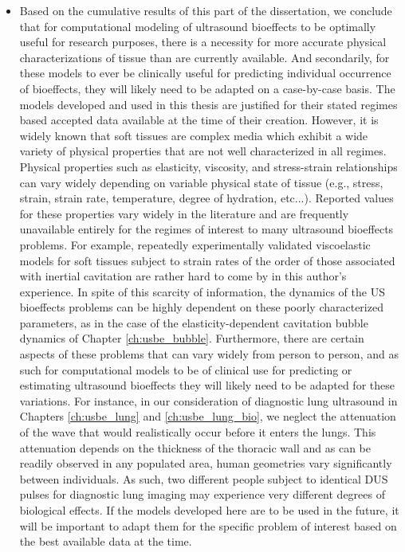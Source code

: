 \begin{itemize}
\item Based on the cumulative results of this part of the
  dissertation, we conclude that for computational modeling of
  ultrasound bioeffects to be optimally useful for research purposes,
  there is a necessity for more accurate physical characterizations of
  tissue than are currently available. And secondarily, for these
  models to ever be clinically useful for predicting individual
  occurrence of bioeffects, they will likely need to be adapted on a
  case-by-case basis. The models developed and used in this thesis are
  justified for their stated regimes based accepted data available at
  the time of their creation. However, it is widely known that soft
  tissues are complex media which exhibit a wide variety of physical
  properties that are not well characterized in all regimes. Physical
  properties such as elasticity, viscosity, and stress-strain
  relationships can vary widely depending on variable physical state
  of tissue (e.g., stress, strain, strain rate, temperature, degree of
  hydration, etc...). Reported values for these properties vary
  widely in the literature and are frequently unavailable entirely for
  the regimes of interest to many ultrasound bioeffects problems. For
  example, repeatedly experimentally validated viscoelastic models for
  soft tissues subject to strain rates of the order of those
  associated with inertial cavitation are rather hard to come by in
  this author's experience. In spite of this scarcity of information,
  the dynamics of the \ac{US} bioeffects problems can be highly
  dependent on these poorly characterized parameters, as in the case
  of the elasticity-dependent cavitation bubble dynamics of Chapter
  \ref{ch:usbe_bubble}. Furthermore, there are certain aspects of
  these problems that can vary widely from person to person, and as
  such for computational models to be of clinical use for predicting
  or estimating ultrasound bioeffects they will likely need to be
  adapted for these variations. For instance, in our consideration of
  diagnostic lung ultrasound in Chapters \ref{ch:usbe_lung} and
  \ref{ch:usbe_lung_bio}, we neglect the attenuation of the wave that
  would realistically occur before it enters the lungs. This
  attenuation depends on the thickness of the thoracic wall and as can
  be readily observed in any populated area, human geometries vary
  significantly between individuals. As such, two different people subject to
  identical \ac{DUS} pulses for diagnostic lung imaging may experience
  very different degrees of biological effects. If the models
  developed here are to be used in the future, it will be important to
  adapt them for the specific problem of interest based on the best
  available data at the time.
\end{itemize}

